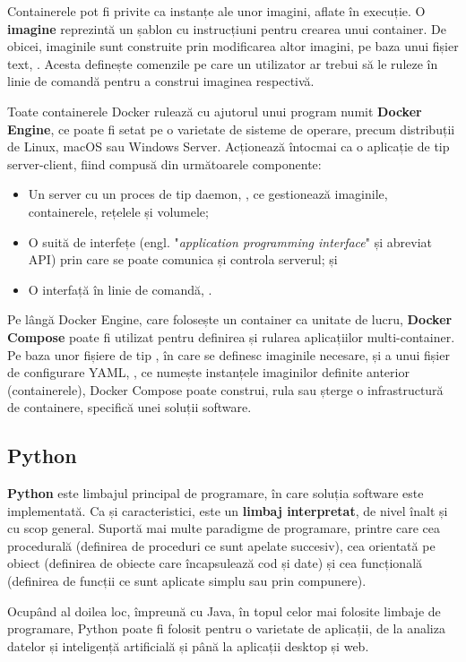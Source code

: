 \documentclass[../../main.tex]{subfiles}
\begin{document}
Containerele pot fi privite ca instanțe ale unor imagini, aflate în execuție. O \textbf{imagine} reprezintă un șablon cu instrucțiuni pentru crearea unui container. De obicei, imaginile sunt construite prin modificarea altor imagini, pe baza unui fișier text, . Acesta definește comenzile pe care un utilizator ar trebui să le ruleze în linie de comandă pentru a construi imaginea respectivă.

Toate containerele Docker rulează cu ajutorul unui program numit \textbf{Docker Engine}, ce poate fi setat pe o varietate de sisteme de operare, precum distribuții de Linux, macOS sau Windows Server. Acționează întocmai ca o aplicație de tip server-client, fiind compusă din următoarele componente:
\begin{itemize}
    \item Un server cu un proces de tip daemon, , ce gestionează imaginile, containerele, rețelele și volumele;
    \item O suită de interfețe (engl. "\textit{application programming interface}" și abreviat API) prin care se poate comunica și controla serverul; și
    \item O interfață în linie de comandă, .
\end{itemize}

Pe lângă Docker Engine, care folosește un container ca unitate de lucru, \textbf{Docker Compose} poate fi utilizat pentru definirea și rularea aplicațiilor multi-container. Pe baza unor fișiere de tip , în care se definesc ima\-ginile necesare, și a unui fișier de configurare YAML, , ce numește instanțele imaginilor definite anterior (containerele), Docker Compose poate construi, rula sau șterge o infrastructură de containere, specifică unei soluții software.

\subsection{Python}

\textbf{Python} este limbajul principal de programare, în care soluția software este implementată. Ca și caracteristici, este un \textbf{limbaj interpretat}, de nivel înalt și cu scop general. Suportă mai multe paradigme de programare, printre care cea procedurală (definirea de proceduri ce sunt apelate succesiv), cea orientată pe obiect (definirea de obiecte care încapsulează cod și date) și cea funcțională (definirea de funcții ce sunt aplicate simplu sau prin compunere).

Ocupând al doilea loc, împreună cu Java, în topul celor mai folosite limbaje de programare, Python poate fi folosit pentru o varietate de aplicații, de la analiza datelor și inteligență artificială și până la aplicații desktop și web.
\end{document}
